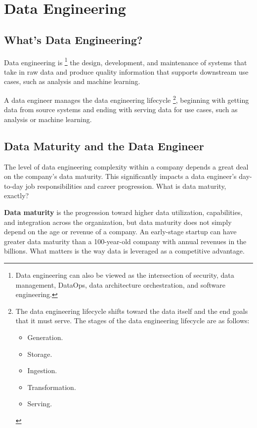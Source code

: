 \section{Data Engineering}


\subsection{What's Data Engineering?}
\noindent
Data engineering is
\footnote{
    Data engineering can also be viewed as the intersection of
    security, data management, DataOps, data architecture
    orchestration, and software engineering.
}
the design, development, and maintenance of systems that
take in raw data and produce quality information that
supports downstream use cases, such as analysis and
machine learning.

A data engineer manages the data engineering lifecycle
\footnote{
    The data engineering lifecycle shifts toward
    the data itself and the end goals that it must serve.
    The stages of the data engineering lifecycle are as follows:
    \begin{itemize}
        \item Generation.
        \item Storage.
        \item Ingestion.
        \item Transformation.
        \item Serving.
    \end{itemize}
}, 
beginning with getting data from source systems and ending
with serving data for use cases, such as analysis or machine
learning.



\subsection*{Data Maturity and the Data Engineer}
The level of data engineering complexity within a company depends
a great deal on the company's data maturity. This significantly
impacts a data engineer's day-to-day job responsibilities and
career progression. What is data maturity, exactly?

\textbf{Data maturity} is the progression toward higher data
utilization, capabilities, and integration across the organization,
but data maturity does not simply depend on the age or revenue of
a company. An early-stage startup can have greater data maturity
than a 100-year-old company with annual revenues in the billions.
What matters is the way data is leveraged as a competitive
advantage.

